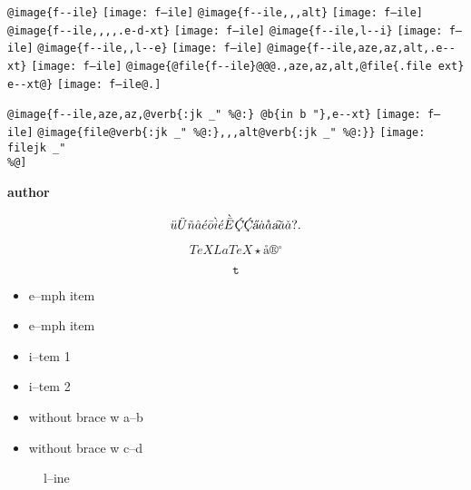 \documentclass{book}
\renewcommand{\includegraphics}[1]{\fbox{FIG \detokenize{#1}}}
\begin{document}
\texttt{@image\{f{-}{-}ile\}} \texttt{[image: f--ile]}
\texttt{@image\{f{-}{-}ile{,}{,},alt\}} \texttt{[image: f--ile]}
\texttt{@image\{f{-}{-}ile{,}{,}{,}{,}.e-d-xt\}} \texttt{[image: f--ile]}
\texttt{@image\{f{-}{-}ile,l{-}{-}i\}} \texttt{[image: f--ile]}
\texttt{@image\{f{-}{-}ile{,}{,}l{-}{-}e\}} \texttt{[image: f--ile]}
\texttt{@image\{f{-}{-}ile,aze,az,alt,.e{-}{-}xt\}} \texttt{[image: f--ile]}
\texttt{@image\{@file\{f{-}{-}ile\}@@@.,aze,az,alt,@file\{.file ext\} e{-}{-}xt@\}} \texttt{[image: f--ile@.]}

\texttt{@image\{f{-}{-}ile,aze,az,@verb\{:jk \_" \%@:\} @b\{in b "\},e{-}{-}xt\}} \texttt{[image: f--ile]}
\texttt{@image\{file@verb\{:jk \_" \%@:\}{,}{,},alt@verb\{:jk \_" \%@:\}\}} \texttt{[image: filejk \_" \\\%@]}


{\bfseries author}%

$$
\ddot{u} \ddot{U} \tilde{n} \hat{a} \acute{e} \bar{o} \grave{i} \acute{e} \grave{\bar{E}}
\textsl{\c{\'{C}}} \textsl{\c{\'{C}}} \textsl{\H{a}} \dot{a} \mathring{a} \textsl{\t{a}}
\breve{a} \check{a}
 ? .
$$

$$
TeX LaTeX \star{} \mathord{\text{\aa{}}} \circledR{} ^{\circ{}} 
$$

$$
\mathtt{t} 
$$

\begin{itemize}[label=\emph{}]
\item e--mph item
\end{itemize}

\begin{itemize}[label=\emph{} after emph]
\item e--mph item
\end{itemize}

\begin{itemize}[label=\textbullet{} a--n itemize line]
\item i--tem 1
\item i--tem 2
\end{itemize}

\begin{itemize}[label={}]
\item without brace w a--b
\item without brace w c--d
\end{itemize}

\begin{description}
\item[{\parbox[b]{\linewidth}{%
a}}]
l--ine
\end{description}
\end{document}
